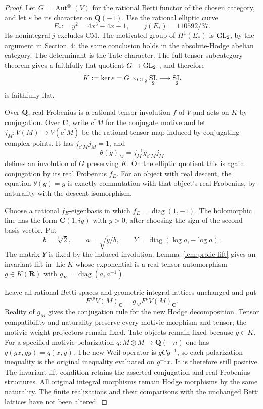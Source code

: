 \documentclass[11pt]{article}
\theoremstyle{definition}\newtheorem{definition}[theorem]{Definition}
\theoremstyle{remark}\newtheorem{remark}[theorem]{Remark}
\newcommand{\Q}{\mathbf Q}\newcommand{\Z}{\mathbf Z}
\newcommand{\R}{\mathbf R}\newcommand{\C}{\mathbf C}
\DeclareMathOperator{\Aut}{Aut}\DeclareMathOperator{\Isom}{Isom}
\DeclareMathOperator{\Lie}{Lie}\DeclareMathOperator{\trdeg}{trdeg}
\DeclareMathOperator{\SL}{SL}\DeclareMathOperator{\End}{End}
\begin{document}
\begin{proof}
Let $G=\Aut^\otimes(V)$ for the rational Betti functor of the chosen category,
and let $\varepsilon$ be its character on $\Q(-1)$. Use the rational elliptic
curve
\[
 E_*:\quad y^2=4x^3-4x-1,\qquad j(E_*)=110592/37.
\]
Its nonintegral $j$ excludes CM. The motivated group of $H^1(E_*)$ is
$\operatorname{GL}_2$, by the argument in Section~4; the same conclusion holds in the
absolute-Hodge abelian category. The determinant is the Tate character.
The full tensor subcategory theorem gives a faithfully flat quotient
$G\to\operatorname{GL}_2$ \cite[Proposition~2.21(a), p.~26]{DeligneMilne}, and therefore
\[
 K:=\ker\varepsilon=G\mathbin{\times}_{\GL_2}\SL_2
 \longrightarrow\SL_2
\]
is faithfully flat.

Over $\Q$, real Frobenius is a rational tensor involution $f$ of $V$ and
acts on $K$ by conjugation. Over $\C$, write $c^*M$ for the conjugate motive
and let $j_M:V(M)\to V(c^*M)$ be the rational tensor map induced by
conjugating complex points. It has $j_{c^*M}j_M=1$, and
\[
 \theta(g)_M=j_M^{-1}g_{c^*M}j_M
\]
defines an involution of $G$ preserving $K$. On the elliptic quotient this
is again conjugation by its real Frobenius $f_E$. For an object with real
descent, the equation $\theta(g)=g$ is exactly commutation with that object's
real Frobenius, by naturality with the descent isomorphism.

Choose a rational $f_E$-eigenbasis in which $f_E=\operatorname{diag}(1,-1)$.
The holomorphic line has the form $\C(1,iy)$ with $y>0$, after choosing the
sign of the second basis vector. Put
\[
 b=\sqrt[3]{2},\qquad a=\sqrt{y/b},\qquad
 Y=\operatorname{diag}(\log a,-\log a).
\]
The matrix $Y$ is fixed by the induced involution. Lemma~\ref{lem:prolie-lift}
gives an invariant lift in $\Lie K$ whose exponential is a real tensor
automorphism $g\in K(\R)$ with
$g_E=\operatorname{diag}(a,a^{-1})$.

Leave all rational Betti spaces and geometric integral lattices unchanged
and put
\[
 F'^pV(M)_\C=g_M F^pV(M)_\C.
\]
Reality of $g_M$ gives the conjugation rule for the new Hodge decomposition.
Tensor compatibility and naturality preserve every motivic morphism and
tensor; the motivic weight projectors remain fixed. Tate objects remain
fixed because $g\in K$. For a specified motivic polarization
$q:M\otimes M\to\Q(-n)$ one has $q(gx,gy)=q(x,y)$. The new Weil operator
is $gCg^{-1}$, so each polarization inequality is the original inequality
evaluated on $g^{-1}x$. It is therefore still positive. The invariant-lift
condition retains the asserted conjugation and real-Frobenius structures.
All original integral morphisms remain Hodge morphisms by the same
naturality. The finite realizations and their comparisons with the unchanged
Betti lattices have not been altered.


\end{proof}
\end{document}
